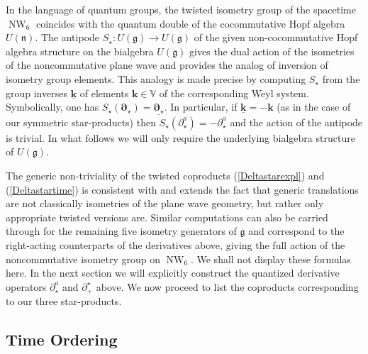 \documentclass[11pt,a4paper]{article}
\DeclareMathOperator{\NW}{NW}
\newcommand{\mbf}[1]{{\boldsymbol {#1} }}
\def\mk{{\mbf k}}
\def\mdell{{\mbf\partial}}
\def\mfn{{\mathfrak n}}
\def\mfg{{\mathfrak g}}
\def\mbbV{{\mathbb V}}
\begin{document}
In the language of quantum groups, the twisted
isometry group of the spacetime $\NW_6$ coincides with the
quantum double of the cocommutative Hopf algebra $U(\mfn)$. The
antipode ${S}_\star:U(\mfg)\to U(\mfg)$ of the given
non-cocommutative Hopf algebra structure on the
bialgebra $U(\mfg)$ gives the dual action of the isometries of the
noncommutative plane wave and provides the analog of inversion of
isometry group elements. This analogy is made precise
by computing ${S}_\star$ from the group inverses
$\underline{\mk}$ of elements $\mk\in\mbbV$ of the corresponding Weyl
system. Symbolically, one has
${S}_\star(\mdell_\star)=\underline{\mdell_\star}$. In particular, if
$\underline{\mk}=-\mk$ (as in the case of our symmetric star-products)
then ${S}_\star(\partial_\star^a)=-\partial_\star^a$ and the action
of the antipode is trivial. In what follows we will only require the
underlying bialgebra structure of $U(\mfg)$.

The generic non-triviality of the twisted coproducts
(\ref{Deltastarexpl}) and (\ref{Deltastartime}) is consistent with and
extends the fact that generic translations are not classically
isometries of the plane wave geometry, but rather only appropriate
twisted versions are. Similar computations can also be carried through
for the remaining five isometry generators of $\mfg$ and correspond to
the right-acting counterparts of the derivatives above, giving the full
action of the noncommutative isometry group on $\NW_6$. We shall not
display these formulas here. In the next section we will explicitly
construct the quantized derivative operators $\partial_\star^a$ and
$\partial_+^\star$ above. We now proceed to list the coproducts
corresponding to our three star-products.

\subsection{Time Ordering \label{TOcoprod}}
\end{document}
